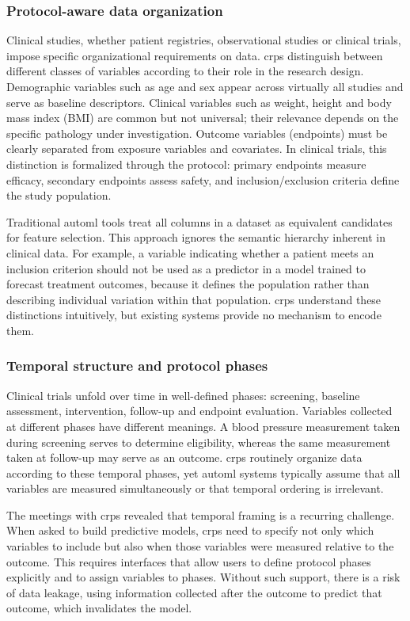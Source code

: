 \documentclass[twoside,final]{Contexto}
\begin{document}
\subsubsection{Protocol-aware data organization}

Clinical studies, whether patient registries, observational studies or clinical trials, impose specific organizational requirements on data. \glspl{crp} distinguish between different classes of variables according to their role in the research design. Demographic variables such as age and sex appear across virtually all studies and serve as baseline descriptors. Clinical variables such as weight, height and body mass index (BMI) are common but not universal; their relevance depends on the specific pathology under investigation. Outcome variables (endpoints) must be clearly separated from exposure variables and covariates. In clinical trials, this distinction is formalized through the protocol: primary endpoints measure efficacy, secondary endpoints assess safety, and inclusion/exclusion criteria define the study population.

Traditional \gls{automl} tools treat all columns in a dataset as equivalent candidates for feature selection. This approach ignores the semantic hierarchy inherent in clinical data. For example, a variable indicating whether a patient meets an inclusion criterion should not be used as a predictor in a model trained to forecast treatment outcomes, because it defines the population rather than describing individual variation within that population. \glspl{crp} understand these distinctions intuitively, but existing systems provide no mechanism to encode them.

\subsubsection{Temporal structure and protocol phases}

Clinical trials unfold over time in well-defined phases: screening, baseline assessment, intervention, follow-up and endpoint evaluation. Variables collected at different phases have different meanings. A blood pressure measurement taken during screening serves to determine eligibility, whereas the same measurement taken at follow-up may serve as an outcome. \glspl{crp} routinely organize data according to these temporal phases, yet \gls{automl} systems typically assume that all variables are measured simultaneously or that temporal ordering is irrelevant.

The meetings with \glspl{crp} revealed that temporal framing is a recurring challenge. When asked to build predictive models, \glspl{crp} need to specify not only which variables to include but also when those variables were measured relative to the outcome. This requires interfaces that allow users to define protocol phases explicitly and to assign variables to phases. Without such support, there is a risk of data leakage, using information collected after the outcome to predict that outcome, which invalidates the model.
\end{document}
